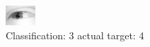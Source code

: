 \begin{figure}[h!]
\begin{center}
\includegraphics[width=0.60\columnwidth]{figures/ID2435_class_3_target_4.png}
\end{center}
\caption{ Classification: 3 actual target: 4}
\label{fig:ID2435_class_3_target_4}
\end{figure}
